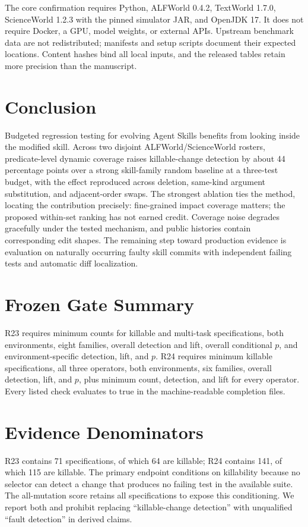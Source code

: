 \documentclass[10pt]{article}
\begin{document}
The core confirmation requires Python, ALFWorld 0.4.2, TextWorld 1.7.0, ScienceWorld 1.2.3 with the pinned simulator JAR, and OpenJDK 17. It does not require Docker, a GPU, model weights, or external APIs. Upstream benchmark data are not redistributed; manifests and setup scripts document their expected locations. Content hashes bind all local inputs, and the released tables retain more precision than the manuscript.

\section{Conclusion}
Budgeted regression testing for evolving Agent Skills benefits from looking inside the modified skill. Across two disjoint ALFWorld/ScienceWorld rosters, predicate-level dynamic coverage raises killable-change detection by about 44 percentage points over a strong skill-family random baseline at a three-test budget, with the effect reproduced across deletion, same-kind argument substitution, and adjacent-order swaps. The strongest ablation ties the method, locating the contribution precisely: fine-grained impact coverage matters; the proposed within-set ranking has not earned credit. Coverage noise degrades gracefully under the tested mechanism, and public histories contain corresponding edit shapes. The remaining step toward production evidence is evaluation on naturally occurring faulty skill commits with independent failing tests and automatic diff localization.




\appendix
\section{Frozen Gate Summary}
R23 requires minimum counts for killable and multi-task specifications, both environments, eight families, overall detection and lift, overall conditional $p$, and environment-specific detection, lift, and $p$. R24 requires minimum killable specifications, all three operators, both environments, six families, overall detection, lift, and $p$, plus minimum count, detection, and lift for every operator. Every listed check evaluates to true in the machine-readable completion files.

\section{Evidence Denominators}
R23 contains 71 specifications, of which 64 are killable; R24 contains 141, of which 115 are killable. The primary endpoint conditions on killability because no selector can detect a change that produces no failing test in the available suite. The all-mutation score retains all specifications to expose this conditioning. We report both and prohibit replacing ``killable-change detection'' with unqualified ``fault detection'' in derived claims.
\end{document}
